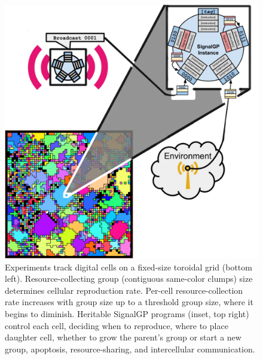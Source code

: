 \begin{figure}
  \centering
  \includegraphics[width=\textwidth]{img/schematic}
  \vspace{-10ex}
  \begin{columns}
  \begin{column}{0.52\textwidth}
  \end{column}
  \begin{column}{0.48\textwidth}
  \caption{
  Experiments track digital cells on a fixed-size toroidal grid (bottom left).
  Resource-collecting group (contiguous same-color clumps) size determines cellular reproduction rate.
  Per-cell resource-collection rate increases with group size up to a threshold group size, where it begins to diminish.
  Heritable SignalGP programs (inset, top right) \cite{lalejini2018evolving} control each cell, deciding when to reproduce, where to place daughter cell, whether to grow the parent's group or start a new group, apoptosis, resource-sharing, and intercellular communication.
  }
  \label{fig:model}
  \end{column}
  \end{columns}
\end{figure}

